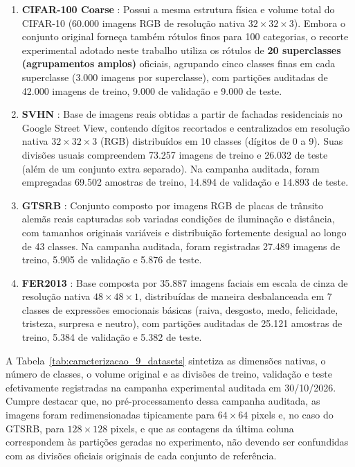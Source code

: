 \documentclass[
    12pt,
    openright,
    oneside,
    a4paper,
    english,
    brazil
]{abntex2}
\begin{document}
\begin{enumerate}
    \item \textbf{CIFAR-100 Coarse} \cite{krizhevsky2009learning}: Possui a mesma estrutura física e volume total do CIFAR-10 (60.000 imagens RGB de resolução nativa \(32 \times 32 \times 3\)). Embora o conjunto original forneça também rótulos finos para 100 categorias, o recorte experimental adotado neste trabalho utiliza os rótulos de \textbf{20 superclasses (agrupamentos amplos)} oficiais, agrupando cinco classes finas em cada superclasse (3.000 imagens por superclasse), com partições auditadas de 42.000 imagens de treino, 9.000 de validação e 9.000 de teste.
    \item \textbf{SVHN} \cite{netzer2011svhn}: Base de imagens reais obtidas a partir de fachadas residenciais no Google Street View, contendo dígitos recortados e centralizados em resolução nativa \(32 \times 32 \times 3\) (RGB) distribuídos em 10 classes (dígitos de 0 a 9). Suas divisões usuais compreendem 73.257 imagens de treino e 26.032 de teste (além de um conjunto extra separado). Na campanha auditada, foram empregadas 69.502 amostras de treino, 14.894 de validação e 14.893 de teste.
    \item \textbf{GTSRB} \cite{stallkamp2012gtsrb}: Conjunto composto por imagens RGB de placas de trânsito alemãs reais capturadas sob variadas condições de iluminação e distância, com tamanhos originais variáveis e distribuição fortemente desigual ao longo de 43 classes. Na campanha auditada, foram registradas 27.489 imagens de treino, 5.905 de validação e 5.876 de teste.
    \item \textbf{FER2013} \cite{goodfellow2013fer2013}: Base composta por 35.887 imagens faciais em escala de cinza de resolução nativa \(48 \times 48 \times 1\), distribuídas de maneira desbalanceada em 7 classes de expressões emocionais básicas (raiva, desgosto, medo, felicidade, tristeza, surpresa e neutro), com partições auditadas de 25.121 amostras de treino, 5.384 de validação e 5.382 de teste.
\end{enumerate}

A Tabela~\ref{tab:caracterizacao_9_datasets} sintetiza as dimensões nativas, o número de classes, o volume original e as divisões de treino, validação e teste efetivamente registradas na campanha experimental auditada em 30/10/2026. Cumpre destacar que, no pré-processamento dessa campanha auditada, as imagens foram redimensionadas tipicamente para \(64 \times 64\) pixels e, no caso do GTSRB, para \(128 \times 128\) pixels, e que as contagens da última coluna correspondem às partições geradas no experimento, não devendo ser confundidas com as divisões oficiais originais de cada conjunto de referência.
\end{document}
